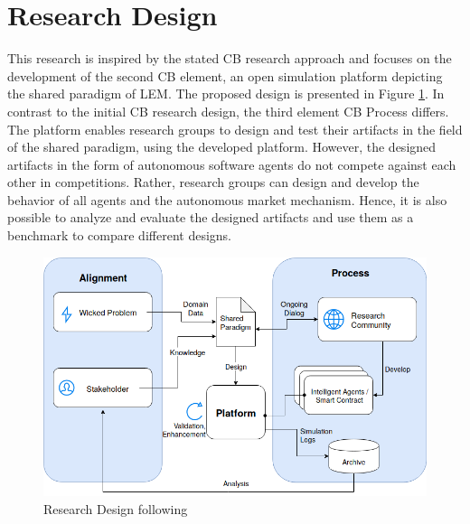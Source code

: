 \section{Research Design}
\label{sec:research_design}

This research is inspired by the stated CB research approach and focuses on the development of 
the second CB element, an open simulation platform depicting the shared paradigm of LEM. 
The proposed design is presented in Figure \ref{figure:competitive_benchmarking}. 
In contrast to the initial CB research design, the third element CB Process differs. 
The platform enables research groups to design and test their artifacts in the field of the shared 
paradigm, using the developed platform. However, the designed artifacts in the form of autonomous 
software agents do not compete against each other in competitions. 
Rather, research groups can design and develop the behavior of all agents and the 
autonomous market mechanism. Hence, it is also possible to analyze and evaluate the designed 
artifacts and use them as a benchmark to compare different designs. 

\begin{figure}[htbp]
	\centering
	\includegraphics[width=1\linewidth]{./figures/competitive_benchmarking.png}
	\caption{Research Design following \protect{}}
	\label{figure:competitive_benchmarking}
\end{figure}

